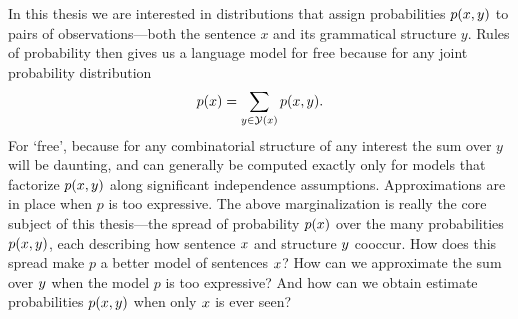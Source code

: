   In this thesis we are interested in distributions that assign probabilities $p(x, y)$ to pairs of observations---both the sentence $x$ and its grammatical structure $y$. Rules of probability then gives us a language model for free because for any joint probability distribution
  \begin{align*}
    p(x) = \sum_{y \in \mathcal{Y}(x)} p(x, y).
  \end{align*}
  For `free', because for any combinatorial structure of any interest the sum over $y$ will be daunting, and can generally be computed exactly only for models that factorize $p(x, y)$ along significant independence assumptions. Approximations are  in place when $p$ is too expressive. The above marginalization is really the core subject of this thesis---the spread of probability $p(x)$ over the many probabilities $p(x, y)$, each describing how sentence $x$ and structure $y$ cooccur. How does this spread make $p$ a better model of sentences $x$? How can we approximate the sum over $y$ when the model $p$ is too expressive? And how can we obtain estimate probabilities $p(x, y)$ when only $x$ is ever seen?




